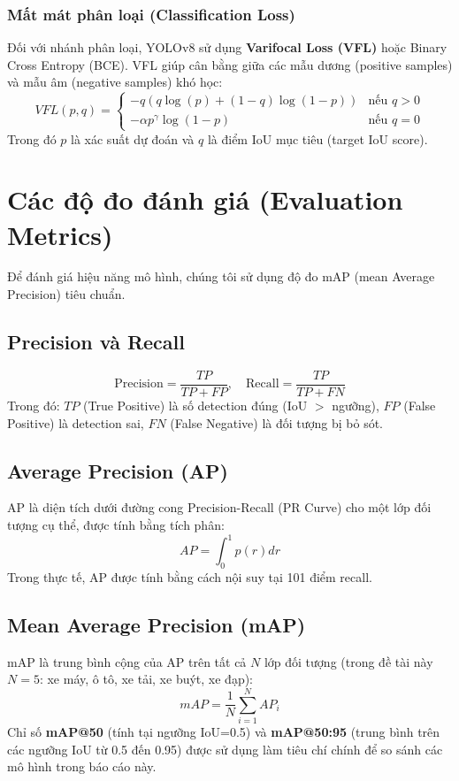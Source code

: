 \subsubsection{Mất mát phân loại (Classification Loss)}
Đối với nhánh phân loại, YOLOv8 sử dụng \textbf{Varifocal Loss (VFL)} hoặc Binary Cross Entropy (BCE). VFL giúp cân bằng giữa các mẫu dương (positive samples) và mẫu âm (negative samples) khó học:
\begin{equation}
    VFL(p, q) = \begin{cases}
    -q (q \log(p) + (1-q) \log(1-p)) & \text{nếu } q > 0 \\
    -\alpha p^\gamma \log(1-p) & \text{nếu } q = 0
    \end{cases}
\end{equation}
Trong đó $p$ là xác suất dự đoán và $q$ là điểm IoU mục tiêu (target IoU score).

\section{Các độ đo đánh giá (Evaluation Metrics)}
Để đánh giá hiệu năng mô hình, chúng tôi sử dụng độ đo mAP (mean Average Precision) tiêu chuẩn.

\subsection{Precision và Recall}
\begin{equation}
    \text{Precision} = \frac{TP}{TP + FP}, \quad \text{Recall} = \frac{TP}{TP + FN}
\end{equation}
Trong đó: $TP$ (True Positive) là số detection đúng (IoU $>$ ngưỡng), $FP$ (False Positive) là detection sai, $FN$ (False Negative) là đối tượng bị bỏ sót.

\subsection{Average Precision (AP)}
AP là diện tích dưới đường cong Precision-Recall (PR Curve) cho một lớp đối tượng cụ thể, được tính bằng tích phân:
\begin{equation}
    AP = \int_{0}^{1} p(r) dr
\end{equation}
Trong thực tế, AP được tính bằng cách nội suy tại 101 điểm recall.

\subsection{Mean Average Precision (mAP)}
mAP là trung bình cộng của AP trên tất cả $N$ lớp đối tượng (trong đề tài này $N=5$: xe máy, ô tô, xe tải, xe buýt, xe đạp):
\begin{equation}
    mAP = \frac{1}{N} \sum_{i=1}^{N} AP_i
\end{equation}
Chỉ số \textbf{mAP@50} (tính tại ngưỡng IoU=0.5) và \textbf{mAP@50:95} (trung bình trên các ngưỡng IoU từ 0.5 đến 0.95) được sử dụng làm tiêu chí chính để so sánh các mô hình trong báo cáo này.

